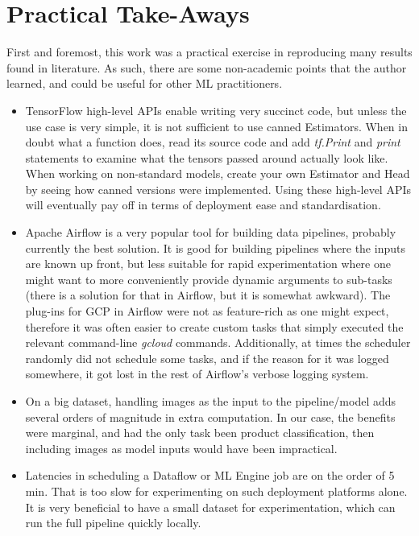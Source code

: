 \section{Practical Take-Aways}

First and foremost, this work was a practical exercise in reproducing many results found in literature.
As such, there are some non-academic points that the author learned, and could be useful for other ML practitioners.

\begin{itemize}
  \item
    TensorFlow high-level APIs enable writing very succinct code, but unless the use case is very simple, it is not sufficient to use canned Estimators.
    When in doubt what a function does, read its source code and add \textit{tf.Print} and \textit{print} statements to examine what the tensors passed around actually look like.
    When working on non-standard models, create your own Estimator and Head by seeing how canned versions were implemented.
    Using these high-level APIs will eventually pay off in terms of deployment ease and standardisation.
  \item
    Apache Airflow is a very popular tool for building data pipelines, probably currently the best solution.
    It is good for building pipelines where the inputs are known up front, but less suitable for rapid experimentation where one might want to more conveniently provide dynamic arguments to sub-tasks (there is a solution for that in Airflow, but it is somewhat awkward).
    The plug-ins for GCP in Airflow were not as feature-rich as one might expect, therefore it was often easier to create custom tasks that simply executed the relevant command-line \textit{gcloud} commands.
    Additionally, at times the scheduler randomly did not schedule some tasks, and if the reason for it was logged somewhere, it got lost in the rest of Airflow's verbose logging system.
  \item
    On a big dataset, handling images as the input to the pipeline/model adds several orders of magnitude in extra computation.
    In our case, the benefits were marginal, and had the only task been product classification, then including images as model inputs would have been impractical.
  \item
    Latencies in scheduling a Dataflow or ML Engine job are on the order of 5 min.
    That is too slow for experimenting on such deployment platforms alone.
    It is very beneficial to have a small dataset for experimentation, which can run the full pipeline quickly locally.

\end{itemize}
